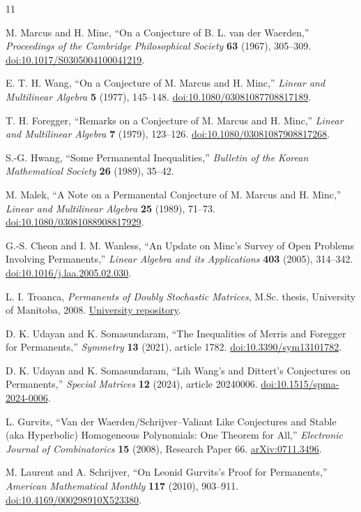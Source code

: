 \documentclass[11pt]{article}
\begin{document}
\begin{thebibliography}{11}
\small

M. Marcus and H. Minc, ``On a Conjecture of B. L. van der Waerden,''
   \emph{Proceedings of the Cambridge Philosophical Society} \textbf{63} (1967),
   305--309.
   \href{https://doi.org/10.1017/S0305004100041219}{doi:10.1017/S0305004100041219}.

E. T. H. Wang, ``On a Conjecture of M. Marcus and H. Minc,'' \emph{Linear and
   Multilinear Algebra} \textbf{5} (1977), 145--148.
   \href{https://doi.org/10.1080/03081087708817189}{doi:10.1080/03081087708817189}.

T. H. Foregger, ``Remarks on a Conjecture of M. Marcus and H. Minc,''
   \emph{Linear and Multilinear Algebra} \textbf{7} (1979), 123--126.
   \href{https://doi.org/10.1080/03081087908817268}{doi:10.1080/03081087908817268}.

S.-G. Hwang, ``Some Permanental Inequalities,'' \emph{Bulletin of the Korean
   Mathematical Society} \textbf{26} (1989), 35--42.

M. Malek, ``A Note on a Permanental Conjecture of M. Marcus and H. Minc,''
   \emph{Linear and Multilinear Algebra} \textbf{25} (1989), 71--73.
   \href{https://doi.org/10.1080/03081088908817929}{doi:10.1080/03081088908817929}.

G.-S. Cheon and I. M. Wanless, ``An Update on Minc's Survey of Open
   Problems Involving Permanents,'' \emph{Linear Algebra and its Applications}
   \textbf{403} (2005), 314--342.
   \href{https://doi.org/10.1016/j.laa.2005.02.030}{doi:10.1016/j.laa.2005.02.030}.

L. I. Troanca, \emph{Permanents of Doubly Stochastic Matrices}, M.Sc. thesis,
   University of Manitoba, 2008.
   \href{https://mspace.lib.umanitoba.ca/handle/1993/3036}{University repository}.

D. K. Udayan and K. Somasundaram, ``The Inequalities of Merris and
   Foregger for Permanents,'' \emph{Symmetry} \textbf{13} (2021), article 1782.
   \href{https://doi.org/10.3390/sym13101782}{doi:10.3390/sym13101782}.

D. K. Udayan and K. Somasundaram, ``Lih Wang's and Dittert's Conjectures
    on Permanents,'' \emph{Special Matrices} \textbf{12} (2024), article 20240006.
    \href{https://doi.org/10.1515/spma-2024-0006}{doi:10.1515/spma-2024-0006}.

L. Gurvits, ``Van der Waerden/Schrijver--Valiant Like Conjectures and
    Stable (aka Hyperbolic) Homogeneous Polynomials: One Theorem for All,''
    \emph{Electronic Journal of Combinatorics} \textbf{15} (2008), Research Paper 66.
    \href{https://arxiv.org/abs/0711.3496}{arXiv:0711.3496}.

M. Laurent and A. Schrijver, ``On Leonid Gurvits's Proof for Permanents,''
    \emph{American Mathematical Monthly} \textbf{117} (2010), 903--911.
    \href{https://doi.org/10.4169/000298910X523380}{doi:10.4169/000298910X523380}.

\end{thebibliography}
\end{document}
